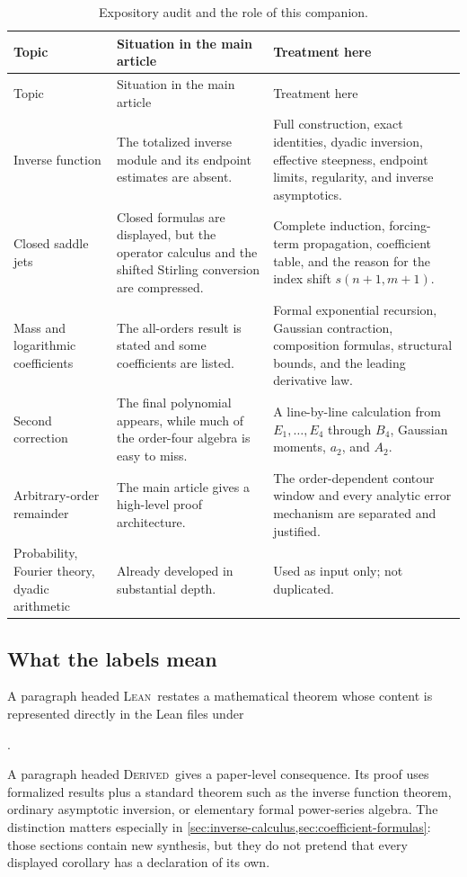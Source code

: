 \documentclass[11pt,oneside]{article}
\theoremstyle{definition}
\theoremstyle{remark}
\newcommand{\Formalized}{\textsc{Lean}}
\newcommand{\Derived}{\textsc{Derived}}
\begin{document}
\begin{longtable}{>{\raggedright\arraybackslash}p{}
                  >{\raggedright\arraybackslash}p{}
                  >{\raggedright\arraybackslash}p{}}
\caption{Expository audit and the role of this companion.}
\label{tab:audit}\\
\toprule
Topic & Situation in the main article & Treatment here\\
\midrule
\endfirsthead
\toprule
Topic & Situation in the main article & Treatment here\\
\midrule
\endhead
Inverse function & The totalized inverse module and its endpoint estimates
are absent. & Full construction, exact identities, dyadic inversion,
effective steepness, endpoint limits, regularity, and inverse
asymptotics.\\
Closed saddle jets & Closed formulas are displayed, but the operator
calculus and the shifted Stirling conversion are compressed. & Complete
induction, forcing-term propagation, coefficient table, and the reason for
the index shift $s(n+1,m+1)$.\\
Mass and logarithmic coefficients & The all-orders result is stated and
some coefficients are listed. & Formal exponential recursion, Gaussian
contraction, composition formulas, structural bounds, and the leading
derivative law.\\
Second correction & The final polynomial appears, while much of the
order-four algebra is easy to miss. & A line-by-line calculation from
$E_1,\dots,E_4$ through $B_4$, Gaussian moments, $a_2$, and $A_2$.\\
Arbitrary-order remainder & The main article gives a high-level proof
architecture. & The order-dependent contour window and every analytic
error mechanism are separated and justified.\\
Probability, Fourier theory, dyadic arithmetic & Already developed in
substantial depth. & Used as input only; not duplicated.\\
\bottomrule
\end{longtable}

\subsection{What the labels mean}

A paragraph headed \Formalized\ restates a mathematical theorem whose
content is represented directly in the Lean files under
\begin{center}
.
\end{center}
A paragraph headed \Derived\ gives a paper-level consequence.  Its proof
uses formalized results plus a standard theorem such as the inverse
function theorem, ordinary asymptotic inversion, or elementary formal
power-series algebra.  The distinction matters especially in
\cref{sec:inverse-calculus,sec:coefficient-formulas}: those sections contain
new synthesis, but they do not pretend that every displayed corollary has
a declaration of its own.
\end{document}
